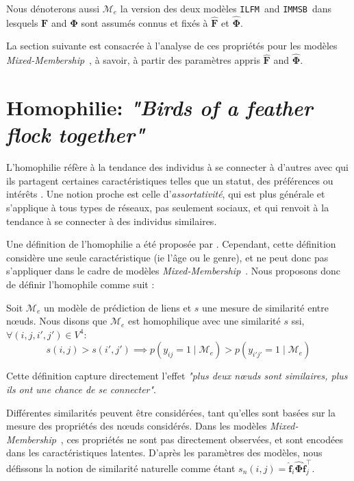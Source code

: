 \documentclass[french]{hermes-journal}
\newcommand{\ilfm}{\texttt{ILFM}}
\newcommand{\immsb}{\texttt{IMMSB}}
\newcommand{\mmm}{\textit{Mixed-Membership}~}
\newcommand{\pr}{p}
\newcommand{\mat}[1]{\bm{#1}}
\begin{document}
Nous dénoterons aussi $\mathcal{M}_e$ la version des deux modèles \ilfm\ and \immsb\ dans lesquels $\mat{F}$ and $\mat{\Phi}$ sont assumés connus et fixés à $\mat{\hat{F}}$ et  $\mat{\hat{\Phi}}$.

La section suivante est consacrée à l'analyse  de ces propriétés pour les modèles \mmm, à savoir, à partir des paramètres appris $\mat{\hat{F}}$ and $\mat{\hat{\Phi}}$.


\section{Homophilie: \emph{"Birds of a feather flock together"}}
\label{sec:homophily}

L'homophilie réfère à la tendance des individus à se connecter à d'autres avec qui ils partagent certaines caractéristiques telles que un statut, des préférences ou intérêts \cite{mcpherson2001birds,lazarsfeld1954friendship}.   Une notion proche est celle d'\emph{assortativité}, qui est plus générale et s'applique à tous types de réseaux, pas seulement sociaux, et qui renvoit à la tendance à se connecter à des individus similaires.


Une définition de l'homophilie a été proposée par \cite{la2010randomization}. Cependant, cette définition considère une seule caractéristique (ie l'âge ou le genre), et ne peut donc pas s'appliquer dans le cadre de modèles \mmm. Nous proposons donc de définir l'homophile comme suit : 
\begin{definition}[Homophilie] \label{def:homophily}
    Soit $\mathcal{M}_e$  un modèle de prédiction de liens et $s$ une mesure de similarité entre n\oe{}uds. Nous disons que $\mathcal{M}_e$ est homophilique avec une similarité $s$ ssi, $\forall (i,j,i',j') \in V^4$:
\begin{equation}
s(i,j) > s(i',j')  \implies \pr(y_{ij}=1 \mid \mathcal{M}_e) > \pr(y_{i'j'}=1  \mid \mathcal{M}_e) \nonumber
\end{equation}

\end{definition}

\noindent Cette définition capture directement l'effet \emph{"plus deux n\oe{}uds sont similaires, plus ils ont une chance de se connecter"}. 

Différentes similarités peuvent être considérées, tant qu'elles sont basées sur la mesure des propriétés des n\oe{}uds considérés.  Dans les modèles \mmm, ces propriétés ne sont pas directement observées, et sont encodées dans les caractéristiques latentes. D'après les paramètres des modèles, nous défissons la notion de similarité naturelle comme étant $s_n(i,j) = \mat{\hat{f}}_{i} \mat{\hat{\Phi}} \mat{\hat{f}}_j^\top$.
\end{document}
